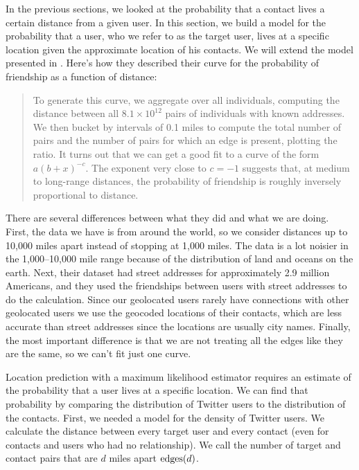 \label{sec:model}

In the previous sections, we looked at the probability that a contact lives a
certain distance from a given user.
%
In this section, we build a model for the probability that a user, who we refer
to as the target user, lives at a specific location given the approximate
location of his contacts.
%
We will extend the model presented in \cite{backstrom2010find}.
%
Here's how they described their curve for the probability of friendship as a
function of distance:
\begin{quote}
To generate this curve, we aggregate over all individuals, computing the
distance between all $8.1 \times 10^{12}$ pairs of individuals with known
addresses.
We then bucket by intervals of 0.1 miles to compute the total number of pairs
and the number of pairs for which an edge is present, plotting the ratio. It
turns out that we can get a good fit to a curve of the form $a(b+x)^{-c}$.
The exponent very close to $c=-1$ suggests that, at medium to long-range
distances, the probability of friendship is roughly inversely proportional to
distance.
\end{quote}

There are several differences between what they did and what we are doing.
%
First, the data we have is from around the world, so we consider distances up
to 10,000 miles apart instead of stopping at 1,000 miles.
%
The data is a lot noisier in the 1,000--10,000 mile range because of the
distribution of land and oceans on the earth.
%
Next, their dataset had street addresses for approximately 2.9 million
Americans, and they used the friendships between users with street addresses to
do the calculation.
%
Since our geolocated users rarely have connections with other geolocated users
we use the geocoded locations of their contacts, which are less accurate than
street addresses since the locations are usually city names.
%
Finally, the most important difference is that we are not treating all the
edges like they are the same, so we can't fit just one curve.

Location prediction with a maximum likelihood estimator requires an estimate of
the probability that a user lives at a specific location.
%
We can find that probability by comparing the distribution of Twitter users to
the distribution of the contacts.
%
First, we needed a model for the density of Twitter users.
%
We calculate the distance between every target user and every contact
(even for contacts and users who had no relationship).
%
We call the number of target and contact pairs that are $d$ miles apart
$\operatorname{edges}(d)$.


